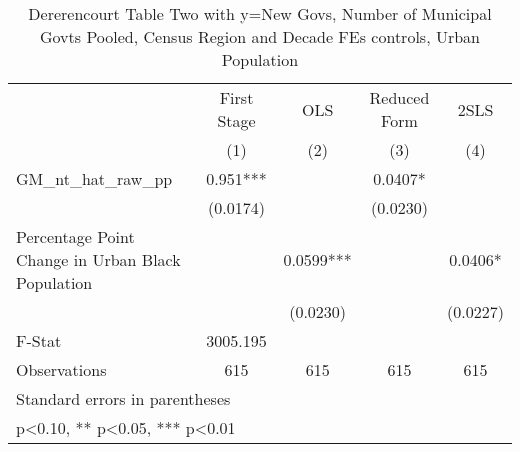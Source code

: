 \begin{table}[htbp]\centering
\def\sym#1{\ifmmode^{#1}\else\(^{#1}\)\fi}
\caption{Dererencourt Table Two with y=New Govs, Number of Municipal Govts  Pooled, Census Region and Decade FEs controls, Urban Population}
\begin{tabular}{l*{4}{c}}
\toprule
                    & First Stage   &         OLS   &Reduced Form   &        2SLS   \\
                    &\multicolumn{1}{c}{(1)}   &\multicolumn{1}{c}{(2)}   &\multicolumn{1}{c}{(3)}   &\multicolumn{1}{c}{(4)}   \\
\midrule
GM\_nt\_hat\_raw\_pp    &       0.951***&               &      0.0407*  &               \\
                    &    (0.0174)   &               &    (0.0230)   &               \\
\addlinespace
Percentage Point Change in Urban Black Population&               &      0.0599***&               &      0.0406*  \\
                    &               &    (0.0230)   &               &    (0.0227)   \\
\midrule
F-Stat              &    3005.195   &               &               &               \\
Observations        &         615   &         615   &         615   &         615   \\
\bottomrule
\multicolumn{5}{l}{\footnotesize Standard errors in parentheses}\\
\multicolumn{5}{l}{\footnotesize * p<0.10, ** p<0.05, *** p<0.01}\\
\end{tabular}
\end{table}
